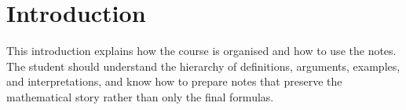 \chapter*{Introduction}

This introduction explains how the course is organised and how to use the notes. The student should understand the hierarchy of definitions, arguments, examples, and interpretations, and know how to prepare notes that preserve the mathematical story rather than only the final formulas.




